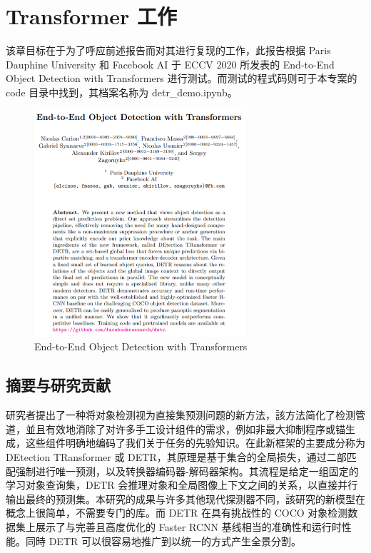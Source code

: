 \section{Transformer 工作}

该章目标在于为了呼应前述报告而对其进行复现的工作，此报告根据 Paris Dauphine University 和 Facebook AI 于 ECCV 2020 所发表的 End-to-End Object Detection with Transformers \cite{carion2020end} 进行测试。而测试的程式码则可于本专案的 code 目录中找到，其档案名称为 detr\_demo.ipynb。

\begin{figure}[htb]
\centering 
\includegraphics[width=0.7\textwidth]{img/c4d1.png} 
\caption{End-to-End Object Detection with Transformers}
\label{Test}
\end{figure}

\subsection{摘要与研究贡献}

研究者提出了一种将对象检测视为直接集预测问题的新方法，該方法简化了检测管道，並且有效地消除了对许多手工设计组件的需求，例如非最大抑制程序或锚生成，这些组件明确地编码了我们关于任务的先验知识。在此新框架的主要成分称为 DEtection TRansformer 或 DETR，其原理是基于集合的全局损失，通过二部匹配强制进行唯一预测，以及转换器编码器-解码器架构。其流程是给定一组固定的学习对象查询集，DETR 会推理对象和全局图像上下文之间的关系，以直接并行输出最终的预测集。本研究的成果与许多其他现代探测器不同，該研究的新模型在概念上很简单，不需要专门的库。而 DETR 在具有挑战性的 COCO 对象检测数据集上展示了与完善且高度优化的 Faster RCNN 基线相当的准确性和运行时性能。同時 DETR 可以很容易地推广到以统一的方式产生全景分割。

